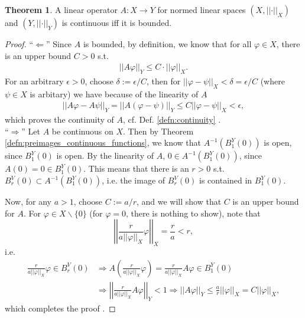\documentclass[12pt, a4paper]{article}
\numberwithin{equation}{section}
\theoremstyle{definition}
\theoremstyle{definition}
\newtheorem{theorem}[thm]{Theorem}
\newcommand{\norm}[2]{\left\vert\left\vert #1 \right\vert\right\vert_{#2}}
\begin{document}
	\begin{theorem}\label{thrm:continuous-operator-bounded}
		A linear operator $A:X\to Y$ for normed linear spaces $\left(X, \norm{\cdot}{X}\right)$ and $\left( Y, \norm{\cdot}{Y}\right)$ is continuous iff it is bounded.
	\end{theorem}

	\begin{proof}
		\enquote{$\Longleftarrow$} Since $A$ is bounded, by definition, we know that for all $\varphi\in X$, there is an upper bound $C > 0$ s.t. 
		\begin{align}
			\norm{A\varphi}{Y} \leq C\cdot \norm{\varphi}{X}.
		\end{align}
		For an arbitrary $\epsilon > 0$, choose $\delta := \epsilon/C$, then for $\norm{\varphi - \psi}{X} < \delta = \epsilon/C$ (where $\psi\in X$ is arbitary) we have because of the linearity of $A$
		\begin{align}
			\norm{A\varphi - A\psi}{Y} = \norm{A(\varphi - \psi)}{Y} \leq C\norm{\varphi - \psi}{X} < \epsilon,
		\end{align}
		which proves the continuity of $A$, cf. Def. \ref{defn:continuity} \cite{556667}.
		\\
		
		\enquote{$\Longrightarrow$} Let $A$ be continuous on $X$. Then by Theorem \ref{defn:preimages_continuous_functions}, we know that $A^{-1}\left(B^{Y}_1(0)\right)$ is open, since $B^{Y}_{1}(0)$ is open. By the linearity of $A$, $0\in A^{-1}\left(B^{Y}_1(0)\right)$, since \\ $A(0) = 0 \in B_1^{Y}(0)$. This means that there is an $r > 0$ s.t. $B^{V}_{r}(0) \subset A^{-1}\left(B^{Y}_1(0)\right)$, i.e. the image of $B^{V}_{r}(0)$ is contained in $B^{Y}_{1}(0)$.
		
		Now, for any $a > 1$, choose $C := a/r$, and we will show that $C$ is an upper bound for $A$. For $\varphi\in X\backslash \{0\}$ (for $\varphi =0$, there is nothing to show), note that $$\norm{\frac{r}{a\norm{\varphi}{X}}\varphi}{X} = \frac{r}{a} < r,$$ i.e. 
		\begin{align}
			\frac{r}{a\norm{\varphi}{X}}\varphi \in B_{r}^{V}(0) &\Rightarrow A\left(\frac{r}{a\norm{\varphi}{X}}\varphi\right) = \frac{r}{a\norm{\varphi}{X}}A\varphi\in B^{Y}_{1}(0) 
			\\[6pt] &\Rightarrow \norm{\frac{r}{a\norm{\varphi}{X}}A\varphi}{Y} < 1 \Rightarrow \norm{A\varphi}{Y} \leq \frac{a}{r}\norm{\varphi}{X} = C\norm{\varphi}{X},
		\end{align}
		which completes the proof \cite[p. 2]{src:mit_lec}.
	\end{proof}
	
\end{document}

